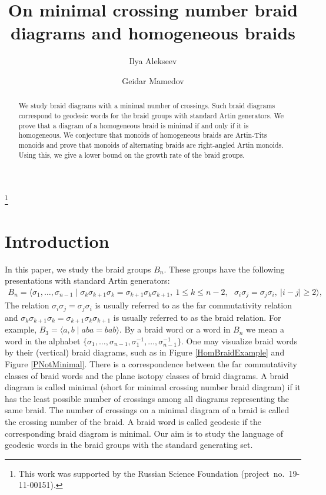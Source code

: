 \documentclass[11pt]{amsart}
\theoremstyle{plain}
\theoremstyle{definition}
\numberwithin{equation}{section}
\begin{document}
\title{On minimal crossing number braid diagrams and homogeneous braids}

\author{Ilya Alekseev}
\author{Geidar Mamedov}
\thanks{This work was supported by the Russian Science Foundation \mbox{(project no. 19-11-00151)}.}

\address{Laboratory of Modern Algebra and Applications, St. Petersburg State University, 14th Line, 29b, Saint Petersburg, 199178 Russia}
\address{Laboratory of Continuous Mathematical Education (School 564 of St. Petersburg), nab. Obvodnogo kanala 143, Saint Petersburg, Russia}

\begin{abstract}
We study braid diagrams with a minimal number of crossings. Such braid diagrams correspond to geodesic words for the braid groups with standard Artin generators. We prove that a diagram of a homogeneous braid is minimal if and only if it is homogeneous. We conjecture that monoids of homogeneous braids are Artin-Tits monoids and prove that monoids of alternating braids are right-angled Artin monoids. Using this, we give a lower bound on the growth rate of the braid groups.
\end{abstract}

\maketitle

\section{Introduction}

In this paper, we study the braid groups $B_n$. These groups have the following presentations with standard Artin generators:
\begin{align*}
B_n = \langle \sigma_1, \ldots, \sigma_{n-1} \mid \sigma_k\sigma_{k+1}\sigma_k=\sigma_{k+1}\sigma_k\sigma_{k+1},\ 1 \leq k \leq n-2, \ \ \  \sigma_i\sigma_j=\sigma_j\sigma_i, \ |i-j|\geq 2 \rangle,
\end{align*}
The relation $\sigma_i\sigma_j=\sigma_j\sigma_i$ is usually referred to as the far commutativity relation and $\sigma_k\sigma_{k+1}\sigma_k=\sigma_{k+1}\sigma_k\sigma_{k+1}$ is usually referred to as the braid relation. For example, $B_3 = \langle a,b \mid aba = bab\rangle$. By a braid word or a word in $B_n$ we mean a word in the alphabet $\{\sigma_1, \ldots, \sigma_{n-1},\sigma_1^{-1}, \ldots, \sigma_{n-1}^{-1}\}.$ One may visualize braid words by their (vertical) braid diagrams, such as in Figure \ref{HomBraidExample} and Figure \ref{PNotMinimal}. There is a correspondence between the far commutativity classes of braid words and the plane isotopy classes of braid diagrams. A braid diagram is called minimal (short for minimal crossing number braid diagram) if it has the least possible number of crossings among all diagrams representing the same braid. The number of crossings on a minimal diagram of a braid is called the crossing number of the braid. A braid word is called geodesic if the corresponding braid diagram is minimal. Our aim is to study the language of geodesic words in the braid groups with the standard generating set.
\end{document}
